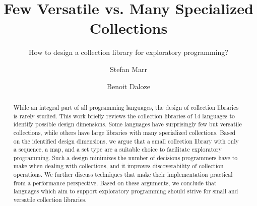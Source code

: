 \documentclass[sigconf, 10pt]{acmart}
\def\Title{Few Versatile vs. Many Specialized Collections}
\def\SubTitle{How to design a collection library for exploratory programming?}
\def\LangCnt{14\xspace}
\begin{document}
\title{\Title}
\subtitle{\SubTitle}

\author{Stefan Marr}

\author{Benoit Daloze}




\begin{abstract}
While an integral part of all programming languages,
the design of collection libraries is rarely studied.
This work briefly reviews the collection libraries of \LangCnt languages
to identify possible design dimensions.
Some languages have surprisingly few but versatile collections,
while others have large libraries with many specialized collections.
Based on the identified design dimensions,
we argue that a small collection library
with only a sequence, a map, and a set type
are a suitable choice to facilitate exploratory programming.
Such a design minimizes the number of decisions programmers
have to make when dealing with collections,
and it improves discoverability of collection operations.
We further discuss
techniques
that make their implementation practical from a performance perspective.
Based on these arguments,
we conclude that languages which aim to support exploratory programming
should strive for small and versatile collection libraries.
\end{abstract}
\end{document}
